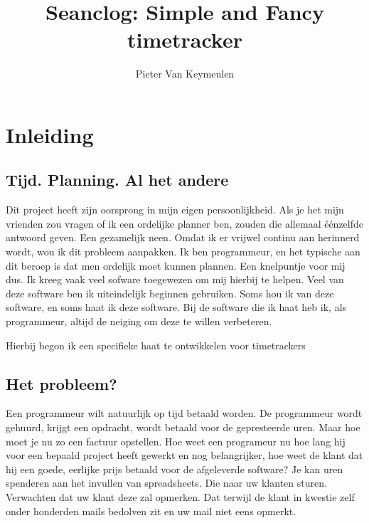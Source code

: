 \documentclass[a4paper,11pt]{article}
\begin{document}
\title{Seanclog: Simple and Fancy timetracker}
\author{Pieter Van Keymeulen}
\maketitle

\section{Inleiding}

\subsection{Tijd. Planning. Al het andere}
Dit project heeft zijn oorsprong in mijn eigen persoonlijkheid. Als je het mijn
vrienden zou vragen of ik een ordelijke planner ben, zouden die allemaal
éénzelfde antwoord geven. Een gezamelijk neen. Omdat ik er vrijwel continu aan
herinnerd wordt, wou ik dit probleem aanpakken. Ik ben programmeur, en het
typische aan dit beroep is dat men ordelijk moet kunnen plannen. Een knelpuntje
voor mij dus. Ik kreeg vaak veel sofware toegewezen om mij hierbij te helpen.
Veel van deze software ben ik uiteindelijk beginnen gebruiken. Soms hou ik van
deze software, en soms haat ik deze software. Bij de software die ik haat heb
ik, als programmeur, altijd de neiging om deze te willen verbeteren.

Hierbij begon ik een specifieke haat te ontwikkelen voor timetrackers

\subsection{Het probleem?}
Een programmeur wilt natuurlijk op tijd betaald worden. De programmeur wordt
gehuurd, krijgt een opdracht, wordt betaald voor de gepresteerde uren. Maar hoe
moet je nu zo een factuur opstellen. Hoe weet een programeur nu hoe lang hij
voor een bepaald project heeft gewerkt en nog belangrijker, hoe weet de klant
dat hij een goede, eerlijke prijs betaald voor de afgeleverde software? Je kan
uren spenderen aan het invullen van spreadsheets. Die naar uw klanten sturen.
Verwachten dat uw klant deze zal opmerken. Dat terwijl de klant in kwestie zelf
onder honderden mails bedolven zit en uw mail niet eens opmerkt.
\end{document}
